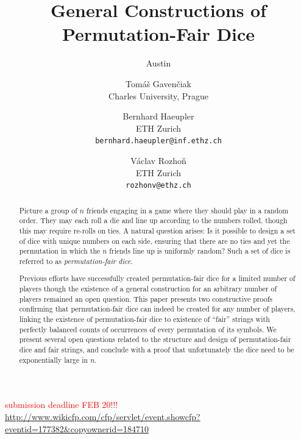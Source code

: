\documentclass{article}
\title{General Constructions of Permutation-Fair Dice}
\author{
Austin
\and Tomáš Gavenčiak \\ 
\small Charles University, Prague \\
\and Bernhard Haeupler \\
\small ETH Zurich \\
\small \texttt{bernhard.haeupler@inf.ethz.ch}\\
\and Václav Rozhoň \\ 
\small{ETH Zurich}\\
\small \texttt{rozhonv@ethz.ch}\\
}
\begin{document}
\maketitle

\textcolor{red}{submission deadline FEB 20!!! \url{http://www.wikicfp.com/cfp/servlet/event.showcfp?eventid=177382&copyownerid=184710}}

\begin{abstract}
Picture a group of $n$ friends engaging in a game where they should play in a random order. They may each roll a die and line up according to the numbers rolled, though this may require re-rolls on ties. A natural question arises: Is it possible to design a set of dice with unique numbers on each side, ensuring that there are no ties and yet the permutation in which the $n$ friends line up is uniformly random? Such a set of dice is referred to as \emph{permutation-fair dice}.

Previous efforts have successfully created permutation-fair dice for a limited number of players \cite{harshbarger2012whogoesfirst,ford2023go,purcell_improved} though the existence of a general construction for an arbitrary number of players remained an open question. This paper presents two constructive proofs confirming that permutation-fair dice can indeed be created for any number of players, linking the existence of permutation-fair dice to existence of ``fair'' strings with perfectly balanced counts of occurrences of every permutation of its symbols. We present several open questions related to the structure and design of permutation-fair dice and fair strings, and conclude with a proof that unfortunately the dice need to be exponentially large in $n$.
\end{abstract}


\end{document}
